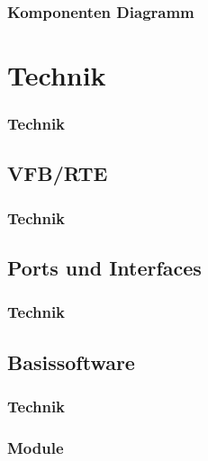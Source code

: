 \documentclass[]{beamer}
\newcommand{\inputImage}[1]{}
\begin{document}
\begin{frame}
\frametitle{Komponenten Diagramm}
    \begin{figure}[ht]
        \centering
        \resizebox{\linewidth}{!}{\inputImage{SMLS_Modell.dia}}
        \label{fig:smls_modell}
    \end{figure}
\end{frame}





\section{Technik}
\label{sec:technik}

\begin{frame}
\frametitle{Technik}

\end{frame}

\subsection{VFB/RTE}
\label{sec:VFB_RTE}
\begin{frame}
\frametitle{Technik}

\end{frame}

\subsection{Ports und Interfaces}
\label{sec:ports_interfaces}
\begin{frame}
\frametitle{Technik}

\end{frame}

\subsection{Basissoftware}
\label{sec:bsw}
\begin{frame}
\frametitle{Technik}

\end{frame}

\begin{frame}
\frametitle{Module}

\end{frame}
\end{document}
